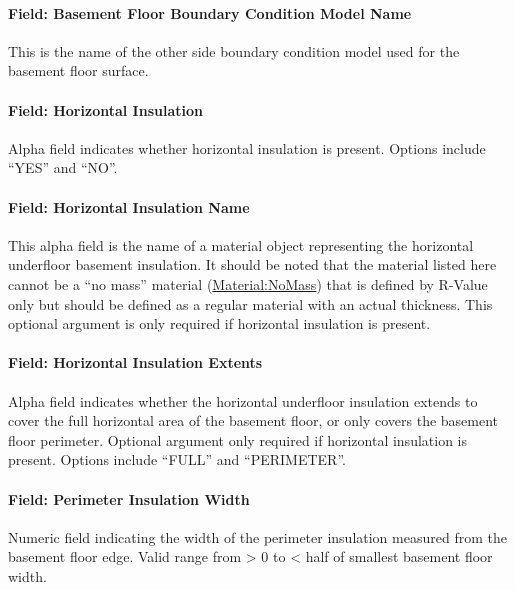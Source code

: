 \paragraph{Field: Basement Floor Boundary Condition Model Name}\label{field-basement-floor-boundary-condition-model-name}

This is the name of the other side boundary condition model used for the basement floor surface.

\paragraph{Field: Horizontal Insulation}\label{field-horizontal-insulation-1}

Alpha field indicates whether horizontal insulation is present. Options include ``YES'' and ``NO''.

\paragraph{Field: Horizontal Insulation Name}\label{field-horizontal-insulation-name}

This alpha field is the name of a material object representing the horizontal underfloor basement insulation. It should be noted that the material listed here cannot be a ``no mass'' material (\hyperref[materialnomass]{Material:NoMass}) that is defined by R-Value only but should be defined as a regular material with an actual thickness. This optional argument is only required if horizontal insulation is present.

\paragraph{Field: Horizontal Insulation Extents}\label{field-horizontal-insulation-extents-1}

Alpha field indicates whether the horizontal underfloor insulation extends to cover the full horizontal area of the basement floor, or only covers the basement floor perimeter. Optional argument only required if horizontal insulation is present. Options include ``FULL'' and ``PERIMETER''.

\paragraph{Field: Perimeter Insulation Width}\label{field-perimeter-insulation-width-1}

Numeric field indicating the width of the perimeter insulation measured from the basement floor edge. Valid range from \textgreater{} 0 to \textless{} half of smallest basement floor width.

